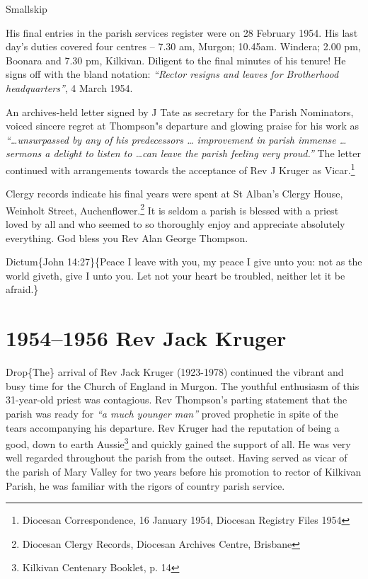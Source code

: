 Smallskip

His final entries in the parish services register were on 28 February 1954. His last day's duties covered four centres -- 7.30 am, Murgon; 10.45am. Windera; 2.00 pm, Boonara and 7.30 pm, Kilkivan. Diligent to the final minutes of his tenure! He signs off with the bland notation: \emph{``Rector resigns and leaves for Brotherhood headquarters''}, 4 March 1954.

An archives-held letter signed by J Tate as secretary for the Parish Nominators, voiced sincere regret at Thompson"s departure and glowing praise for his work as \emph{``\ldots unsurpassed by any of his predecessors \ldots{} improvement in parish immense \ldots{} sermons a delight to listen to \ldots can leave the parish feeling very proud.''} The letter continued with arrangements towards the acceptance of Rev J Kruger as Vicar.\footnote{Diocesan Correspondence, 16 January 1954, Diocesan Registry Files 1954}

Clergy records indicate his final years were spent at St Alban's Clergy House, Weinholt Street, Auchenflower.\footnote{Diocesan Clergy Records, Diocesan Archives Centre, Brisbane} It is seldom a parish is blessed with a priest loved by all and who seemed to so thoroughly enjoy and appreciate absolutely everything. God bless you Rev Alan George Thompson.

Dictum\{John 14:27\}\{Peace I leave with you, my peace I give unto you: not as the world giveth, give I unto you. Let not your heart be troubled, neither let it be afraid.\}

\hypertarget{rev-jack-kruger}{%
\chapter{1954--1956 Rev Jack Kruger}\label{rev-jack-kruger}}

Drop\{The\} arrival of Rev Jack Kruger (1923-1978) continued the vibrant and busy time for the Church of England in Murgon. The youthful enthusiasm of this 31-year-old priest was contagious. Rev Thompson's parting statement that the parish was ready for \emph{``a much younger man''} proved prophetic in spite of the tears accompanying his departure. Rev Kruger had the reputation of being a good, down to earth Aussie\footnote{Kilkivan Centenary Booklet, p. 14} and quickly gained the support of all. He was very well regarded throughout the parish from the outset. Having served as vicar of the parish of Mary Valley for two years before his promotion to rector of Kilkivan Parish, he was familiar with the rigors of country parish service.

